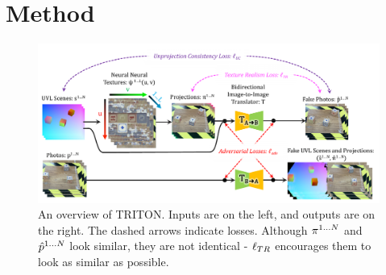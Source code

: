 \documentclass{article}
\begin{document}
\section{Method} \label{sec:method}
	\begin{figure}[t]
	    \vspace{-15pt}
		\begin{center}
			\includegraphics[width=\textwidth]{../images/main_diagram_beautiful.pdf}
		\end{center}
		\vspace{-10pt}
		\caption{
			An overview of TRITON.
			Inputs are on the left, and outputs are on the right.
			The dashed arrows indicate losses.
			Although $\pi^{1\dots N}$ and $\hat{p}^{1\dots N}$ look similar, they are not identical - $\ell_{TR}$ encourages them to look as similar as possible.
		}
		\label{fig:main_diagram}
	\end{figure}
\end{document}
